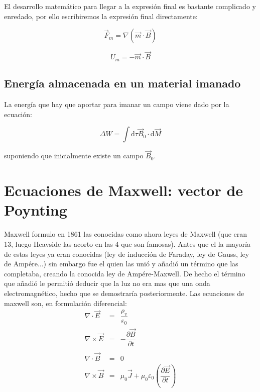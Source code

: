 \documentclass[12pt]{article}
\newcommand{\parentesis}[1]{\left( #1  \right)}
\newcommand{\D}{\mathrm{d}}
\begin{document}
El desarrollo matemático para llegar a la expresión final es bastante complicado y enredado, por ello escribiremos la expresión final directamente:

\begin{equation}
\vec{F}_m = \nabla (\vec{m} \cdot \vec{B}) 
\end{equation}
 
 \begin{equation}
 U_m = - \vec{m} \cdot \vec{B}
 \end{equation}
 
 
 \subsection{Energía almacenada en un material imanado}
 
 La energía que hay que aportar para imanar un campo viene dado por la ecuación:
 
 \begin{equation}
 \Delta W = \int \D \tau \vec{B}_0 \cdot \D \vec{M}
 \end{equation}

suponiendo que inicialmente existe un campo $\vec{B}_0$.
\newpage

\section{Ecuaciones de Maxwell: vector de Poynting}

Maxwell formulo en 1861 las conocidas como ahora leyes de Maxwell (que eran 13, luego Heavside las acorto en las 4 que son famosas). Antes que el la mayoría de estas leyes ya eran conocidas (ley de inducción de Faraday, ley de Gauss, ley de Ampére...) sin embargo fue el quien las unió y añadió un término que las completaba, creando la conocida ley de Ampére-Maxwell. De hecho el término que añadió le permitió deducir que la luz no era mas que una onda electromagnético, hecho que se demostraría posteriormente. Las ecuaciones de maxwell son, en formulación diferencial: \\

\begin{equation}
\begin{array}{lll}
\nabla \cdot \vec{E} & = & \dfrac{\rho_v}{\varepsilon_0} \\ 

\nabla \times \vec{E} & = & - \dfrac{\partial \vec{B}}{\partial t} \\ \\

\nabla \cdot \vec{B} & = & 0 \\ 

\nabla \times \vec{B} & = & \mu_0 \vec{J} + \mu_0 \varepsilon_0 \parentesis{\dfrac{\partial \vec{E}}{\partial t}}

\end{array}
\end{equation}
\end{document}
